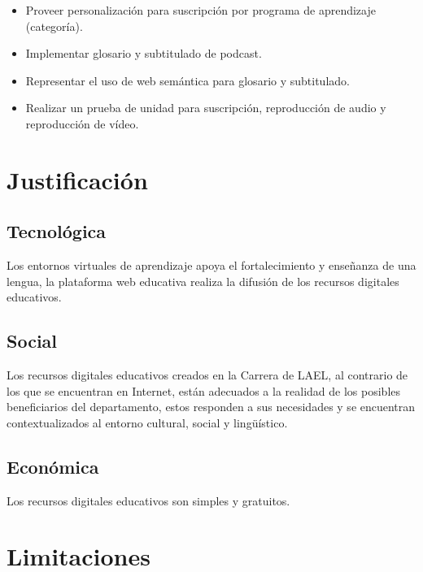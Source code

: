 \begin{itemize}

\item Proveer personalización para suscripción por programa de aprendizaje (categoría).
\item Implementar glosario y subtitulado de podcast.
\item Representar el uso de web semántica para glosario y subtitulado.
\item Realizar un prueba de unidad para suscripción, reproducción de audio y
reproducción de vídeo.

\end{itemize}

\section{Justificación}

\subsection{Tecnológica}

Los entornos virtuales de aprendizaje apoya el fortalecimiento y enseñanza de
una lengua, la plataforma web educativa realiza la difusión de los recursos
digitales educativos. 

\subsection{Social}

Los recursos digitales educativos creados en la Carrera de LAEL, al contrario
de los que se encuentran en Internet, están adecuados a la realidad de los
posibles beneficiarios del departamento, estos responden a sus necesidades y
se encuentran contextualizados al entorno cultural, social y lingüístico.

\subsection{Económica}

Los recursos digitales educativos son simples y gratuitos.

\section{Limitaciones}

